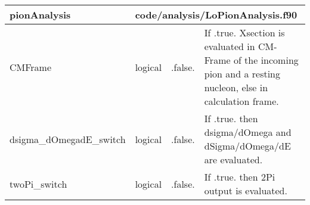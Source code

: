 \documentclass{article}
\begin{document}
\begin{longtable}{llll}
\toprule
\textbf{\large{pionAnalysis}} & \multicolumn{3}{l}{\footnotesize{code/analysis/LoPionAnalysis.f90}}\\*
\midrule
\endfirsthead
\midrule
\endhead
CMFrame & \begin{minipage}[t]{2cm}logical\end{minipage} & \begin{minipage}[t]{2cm}.false.\end{minipage} & \begin{minipage}[t]{12cm}If .true. Xsection is evaluated in CM-Frame of the incoming pion and a resting nucleon, else in calculation frame.\end{minipage}\\*
\midrule
dsigma\_dOmegadE\_switch & \begin{minipage}[t]{2cm}logical\end{minipage} & \begin{minipage}[t]{2cm}.false.\end{minipage} & \begin{minipage}[t]{12cm}If .true. then dsigma/dOmega and dSigma/dOmega/dE are evaluated.\end{minipage}\\*
\midrule
twoPi\_switch & \begin{minipage}[t]{2cm}logical\end{minipage} & \begin{minipage}[t]{2cm}.false.\end{minipage} & \begin{minipage}[t]{12cm}If .true. then 2Pi output is evaluated.\end{minipage}\\*
\bottomrule
\end{longtable}
{ }



\end{document}

